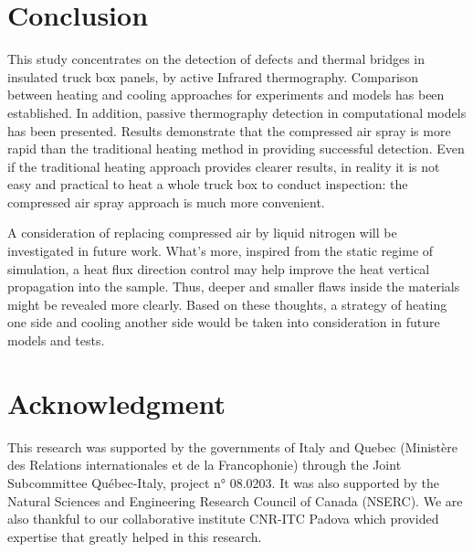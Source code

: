 \documentclass{tQRT2e}
\begin{document}
\section{Conclusion}
This study concentrates on the detection of defects and thermal bridges in insulated truck box panels, by active Infrared thermography. Comparison between heating and cooling approaches for experiments and models has been established. In addition, passive thermography detection in computational models has been presented. Results demonstrate that the compressed air spray is more rapid than the traditional heating method in providing successful detection. Even if the traditional heating approach provides clearer results, in reality it is not easy and practical to heat a whole truck box to conduct inspection: the compressed air spray approach is much more convenient. 

A consideration of replacing compressed air by liquid nitrogen will be investigated in future work. What’s more, inspired from the static regime of simulation, a heat flux direction control may help improve the heat vertical propagation into the sample. Thus, deeper and smaller flaws inside the materials might be revealed more clearly. Based on these thoughts, a strategy of heating one side and cooling another side would be taken into consideration in future models and tests.

\section*{Acknowledgment}
This research was supported by the governments of Italy and Quebec (Ministère des Relations internationales et de la Francophonie) through the Joint Subcommittee Québec-Italy, project n° 08.0203. It was also supported by  the Natural Sciences and Engineering Research Council of Canada (NSERC). We are also thankful to our collaborative institute CNR-ITC Padova which provided expertise that greatly helped in this research. 



\end{document}

